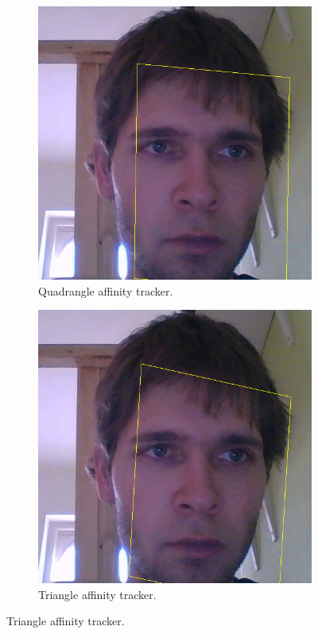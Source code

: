 \begin{figure}[t]
\begin{subfigure}[b]{0.49\textwidth}
	\end{subfigure}
	\begin{subfigure}[b]{0.49\textwidth}
		\centering \includegraphics[width=\linewidth]{img/res-face-aff.png} \caption{Quadrangle affinity tracker.} \label{i:res-face-aff}
	\end{subfigure}
	\begin{subfigure}[b]{0.49\textwidth}
		\centering \includegraphics[width=\linewidth]{img/res-face-bary.png} \caption{Triangle affinity tracker.} \label{i:res-face-bary}

\end{subfigure}
\end{figure}
